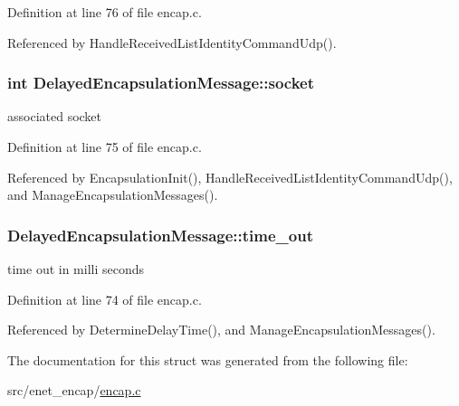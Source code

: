 \-Definition at line 76 of file encap.\-c.



\-Referenced by \-Handle\-Received\-List\-Identity\-Command\-Udp().

\hypertarget{structDelayedEncapsulationMessage_af616a8ae48b9bc51c1117985acc8c37f}{
\subsubsection[{socket}]{\setlength{\rightskip}{0pt plus 5cm}int {\bf \-Delayed\-Encapsulation\-Message\-::socket}}}\label{d4/da1/structDelayedEncapsulationMessage_af616a8ae48b9bc51c1117985acc8c37f}
associated socket 

\-Definition at line 75 of file encap.\-c.



\-Referenced by \-Encapsulation\-Init(), \-Handle\-Received\-List\-Identity\-Command\-Udp(), and \-Manage\-Encapsulation\-Messages().

\hypertarget{structDelayedEncapsulationMessage_a9b68dcfcb0964b7c43bfe18054e71579}{
\subsubsection[{time\-\_\-out}]{ {\bf \-Delayed\-Encapsulation\-Message\-::time\-\_\-out}}}\label{d4/da1/structDelayedEncapsulationMessage_a9b68dcfcb0964b7c43bfe18054e71579}
time out in milli seconds 

\-Definition at line 74 of file encap.\-c.



\-Referenced by \-Determine\-Delay\-Time(), and \-Manage\-Encapsulation\-Messages().



\-The documentation for this struct was generated from the following file\-:\begin{DoxyCompactItemize}
\item 
src/enet\-\_\-encap/\hyperlink{encap_8c}{encap.\-c}\end{DoxyCompactItemize}
